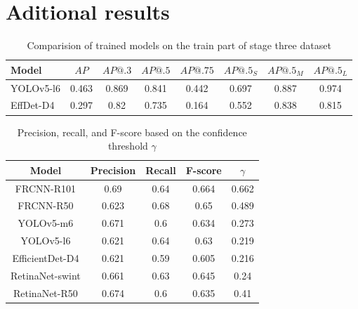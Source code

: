 \appendix



\chapter{Aditional results}



\begin{table}[H]
    \centering
    \begin{tabular}{|l|c|c|c|c|c|c|c|}
        \hline
        Model     & $AP$  & $AP@.3$ & $AP@.5$ & $AP@.75$ & $AP@.5_S$ & $AP@.5_M$ & $AP@.5_L$ \\ \hline
        YOLOv5-l6 & 0.463 & 0.869   & 0.841   & 0.442    & 0.697     & 0.887     & 0.974     \\ \hline
        EffDet-D4 & 0.297 & 0.82    & 0.735   & 0.164    & 0.552     & 0.838     & 0.815     \\ \hline
    \end{tabular}
    \caption{Comparision of trained models on the train part of stage three dataset}
    \label{tab:model_results:stage_three:train}
\end{table}

\begin{table}[H]
    \begin{tabular}{|c||c|c|c|c|}
        \hline
        Model           & Precision & Recall & F-score & $\gamma$ \\ \hline
        FRCNN-R101      & 0.69      & 0.64   & 0.664   & 0.662    \\ \hline
        FRCNN-R50       & 0.623     & 0.68   & 0.65    & 0.489    \\ \hline
        YOLOv5-m6       & 0.671     & 0.6    & 0.634   & 0.273    \\ \hline
        YOLOv5-l6       & 0.621     & 0.64   & 0.63    & 0.219    \\ \hline
        EfficientDet-D4 & 0.621     & 0.59   & 0.605   & 0.216    \\ \hline
        RetinaNet-swint & 0.661     & 0.63   & 0.645   & 0.24     \\ \hline
        RetinaNet-R50   & 0.674     & 0.6    & 0.635   & 0.41     \\ \hline
    \end{tabular}
    \caption{Precision, recall, and F-score based on the confidence threshold $\gamma$}
    \label{tab:model_prf:stage_four}
\end{table}


